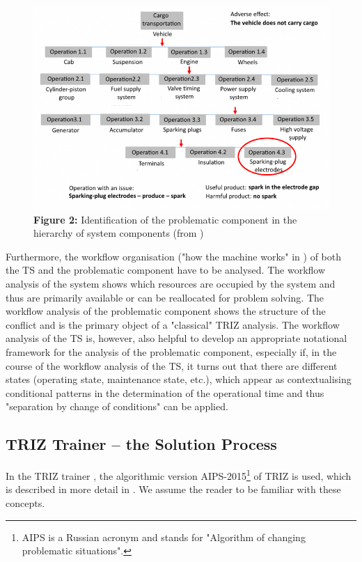 \documentclass[11pt,a4paper]{article}
\begin{document}
\begin{figure}[ht]
  \includegraphics[width=.9\textwidth]{2918_xxl.png}\\
  \textbf{Figure 2:} Identification of the problematic component in the
  hierarchy of system components (from \cite{TT})
\end{figure}

Furthermore, the workflow organisation ("how the machine works" in \cite{TT})
of both the TS and the problematic component have to be analysed. The workflow
analysis of the system shows which resources are occupied by the system and
thus are primarily available or can be reallocated for problem solving. The
workflow analysis of the problematic component shows the structure of the
conflict and is the primary object of a "classical" TRIZ analysis. The
workflow analysis of the TS is, however, also helpful to develop an
appropriate notational framework for the analysis of the problematic
component, especially if, in the course of the workflow analysis of the TS, it
turns out that there are different states (operating state, maintenance state,
etc.), which appear as contextualising conditional patterns in the
determination of the operational time and thus "separation by change of
conditions" \cite[p. 111]{Koltze2017} can be applied.

\subsection*{TRIZ Trainer -- the Solution Process}

In the TRIZ trainer \cite{TT}, the algorithmic version AIPS-2015\footnote{AIPS
  is a Russian acronym and stands for "Algorithm of changing problematic
  situations".} of TRIZ is used, which is described in more detail in
\cite{TT}.  We assume the reader to be familiar with these concepts.
\end{document}
